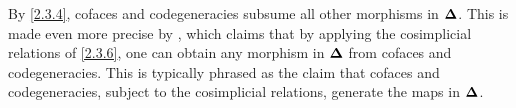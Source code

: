 \begin{remark}\label{2.3.8}
    By \cref{2.3.4}, cofaces and codegeneracies subsume all other morphisms in $\boldsymbol{\Delta}$. This is made even more precise by \cite[VII.5~Prop.~2]{ml}, which claims that by applying the cosimplicial relations of \cref{2.3.6}, one can obtain any morphism in $\boldsymbol{\Delta}$ from cofaces and codegeneracies. This is typically phrased as the claim that cofaces and codegeneracies, subject to the cosimplicial relations, generate the maps in $\boldsymbol{\Delta}$. 
\end{remark}